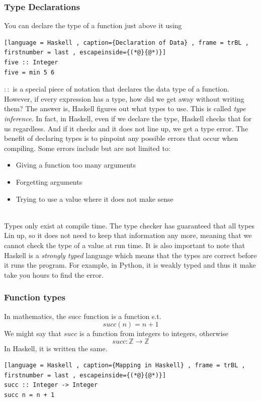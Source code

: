 \documentclass[a4paper]{article}
\theoremstyle{plain}
\theoremstyle{definition}
\theoremstyle{remark}
\begin{document}
\subsubsection{Type Declarations}
You can declare the type of a function just above it using
\begin{lstlisting}[language = Haskell , caption={Declaration of Data} , frame = trBL , firstnumber = last , escapeinside={(*@}{@*)}]
five :: Integer
five = min 5 6
\end{lstlisting}
$::$ is a special piece of notation that declares the data type of a function. However, if every expression has a type, how did we get away without writing them? The answer is, Haskell figures out what types to use. This is called \textit{type inference}. In fact, in Haskell, even if we declare the type, Haskell checks that for us regardless. And if it checks and it does not line up, we get a type error. The benefit of declaring types is to pinpoint any possible errors that occur when compiling. Some errors include but are not limited to:
\begin{itemize}
	\item Giving a function too many arguments
	\item Forgetting arguments
	\item Trying to use a value where it does not make sense
\end{itemize}\\
Types only exist at compile time. The type checker has guaranteed that all types Lin up, so it does not need to keep that information any more, meaning that we cannot check the type of a value at run time. It is also important to note that Haskell is a \textit{strongly typed} language which means that the types are correct before it runs the program. For example, in Python, it is weakly typed and thus it make take you hours to find the error.
\subsubsection{Function types}
In mathematics, the succ function is a function s.t.
\[
succ(n) = n+1
\] 
We might say that $succ$ is a function from integers to integers, otherwise
\[
succ: \mathbb{Z} \to \mathbb{Z}
\] 
In Haskell, it is written the same.
\begin{lstlisting}[language = Haskell , caption={Mapping in Haskell} , frame = trBL , firstnumber = last , escapeinside={(*@}{@*)}]
succ :: Integer -> Integer
succ n = n + 1
\end{lstlisting}
\end{document}
